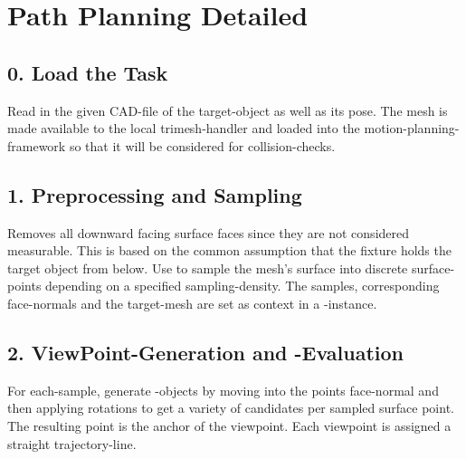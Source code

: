 \documentclass[letterpaper,10pt,english]{sphinxmanual}
\begin{document}
\chapter{Path Planning Detailed}
\label{\detokenize{view_planning_detailed:path-planning-detailed}}\label{\detokenize{view_planning_detailed::doc}}\label{\detokenize{view_planning_detailed:view-planning-detailed}}

\section{0. Load the Task}
\label{\detokenize{view_planning_detailed:load-the-task}}
Read in the given CAD-file of the target-object as well as its pose. The mesh is made available to the local trimesh-handler and loaded into the motion-planning-framework
 so that it will be considered for collision-checks.

\begin{figure}[htbp]
\centering

\noindent{}
\end{figure}


\section{1. Preprocessing and Sampling}
\label{\detokenize{view_planning_detailed:preprocessing-and-sampling}}
Removes all downward facing surface faces since they are not considered measurable. This is based on the common assumption that the fixture holds the target object from below.
Use  to sample the mesh’s surface into discrete surface-points depending on a specified sampling-density. The samples, corresponding face-normals and the target-mesh are
set as context in a {\hyperref[\detokenize{module_sensor_model:sensor-model}]{}}-instance.

\begin{figure}[htbp]
\centering

\noindent{}
\end{figure}


\section{2. ViewPoint-Generation and -Evaluation}
\label{\detokenize{view_planning_detailed:viewpoint-generation-and-evaluation}}
For each-sample, generate {\hyperref[\detokenize{module_view:viewpoint}]{}}-objects by moving into the points face-normal and then applying rotations to get a variety of candidates per sampled surface point.
The resulting point is the anchor of the viewpoint. Each viewpoint is assigned a straight trajectory-line.
\end{document}
